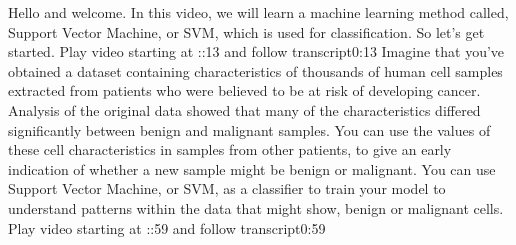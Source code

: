 	
	Hello and welcome. In this video, we will learn a machine learning method called, Support Vector Machine, or SVM, which is used for classification. So let's get started.
	Play video starting at ::13 and follow transcript0:13
	Imagine that you've obtained a dataset containing characteristics of thousands of human cell samples extracted from patients who were believed to be at risk of developing cancer. Analysis of the original data showed that many of the characteristics differed significantly between benign and malignant samples. You can use the values of these cell characteristics in samples from other patients, to give an early indication of whether a new sample might be benign or malignant. You can use Support Vector Machine, or SVM, as a classifier to train your model to understand patterns within the data that might show, benign or malignant cells.
	Play video starting at ::59 and follow transcript0:59
